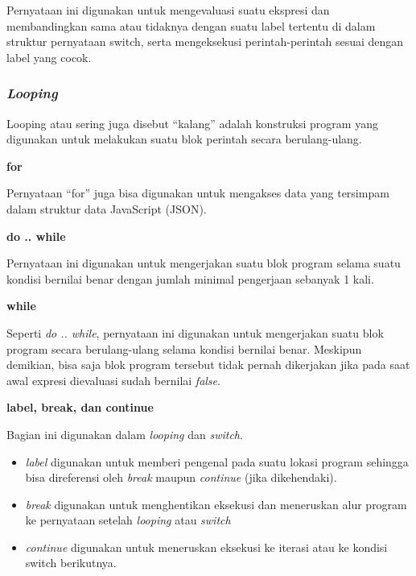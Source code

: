 Pernyataan ini digunakan untuk mengevaluasi suatu ekspresi dan membandingkan sama atau tidaknya dengan suatu label tertentu di dalam struktur pernyataan switch, serta mengeksekusi perintah-perintah sesuai dengan label yang cocok.



\subsubsection{\textit{Looping}}

Looping atau sering juga disebut ``kalang'' adalah konstruksi program yang digunakan untuk melakukan suatu blok perintah secara berulang-ulang.

\textbf{for}



Pernyataan ``for'' juga bisa digunakan untuk mengakses data yang tersimpam dalam struktur data JavaScript (JSON).



\textbf{do .. while}

Pernyataan ini digunakan untuk mengerjakan suatu blok program selama suatu kondisi bernilai benar dengan jumlah minimal pengerjaan sebanyak 1 kali.



\textbf{while}

Seperti \textit{do .. while}, pernyataan ini digunakan untuk mengerjakan suatu blok program secara berulang-ulang selama kondisi bernilai benar. Meskipun demikian, bisa saja blok program tersebut tidak pernah dikerjakan jika pada saat awal expresi dievaluasi sudah bernilai \textit{false}.



\textbf{label, break, dan continue}

Bagian ini digunakan dalam \textit{looping} dan \textit{switch}.
\begin{itemize}
  \item \textit{label} digunakan untuk memberi pengenal pada suatu lokasi program sehingga bisa direferensi oleh \textit{break} maupun \textit{continue} (jika dikehendaki). 
  \item \textit{break} digunakan untuk menghentikan eksekusi dan meneruskan alur program ke pernyataan setelah \textit{looping} atau \textit{switch}
  \item \textit{continue} digunakan untuk meneruskan eksekusi ke iterasi atau ke kondisi switch berikutnya.
\end{itemize}

